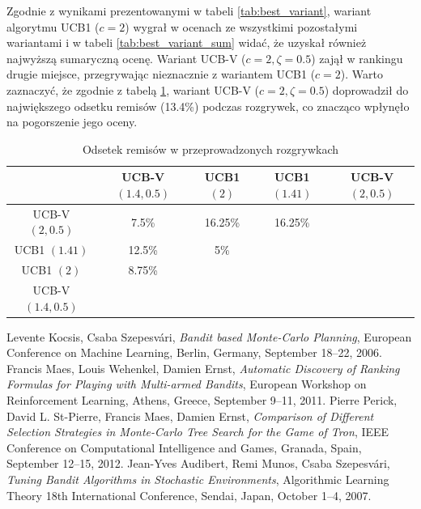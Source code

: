 \documentclass[a4paper,12pt]{article}
\begin{document}
Zgodnie z wynikami prezentowanymi w tabeli \ref{tab:best_variant}, wariant algorytmu UCB1 ($c=2$) wygrał w ocenach ze wszystkimi pozostałymi wariantami i w tabeli \ref{tab:best_variant_sum} widać, że uzyskał również najwyższą sumaryczną ocenę. Wariant UCB-V ($c=2, \zeta=0.5$) zajął w rankingu drugie miejsce, przegrywając nieznacznie z wariantem UCB1 ($c=2$). Warto zaznaczyć, że zgodnie z tabelą \ref{tab:draw_count}, wariant UCB-V ($c=2, \zeta=0.5$) doprowadził do największego odsetku remisów (13.4\%) podczas rozgrywek, co znacząco wpłynęło na pogorszenie jego oceny.

\begin{table}[!h]
	\centering
	\begin{tabular}{|c|c|c|c|c|} \hline
		& UCB-V $(1.4, 0.5)$ & UCB1 $(2)$ & UCB1 $(1.41)$ & UCB-V $(2, 0.5)$ \\ \hline
		UCB-V $(2, 0.5)$ & 7.5\% & 16.25\% & 16.25\% & \cellcolor{lightgray} \\ \hline
		UCB1 $(1.41)$ & 12.5\% & 5\% & \cellcolor{lightgray} & \cellcolor{lightgray} \\ \hline
		UCB1 $(2)$ & 8.75\% & \cellcolor{lightgray} & \cellcolor{lightgray} & \cellcolor{lightgray}  \\ \hline
		UCB-V $(1.4, 0.5)$ & \cellcolor{lightgray} & \cellcolor{lightgray} & \cellcolor{lightgray} & \cellcolor{lightgray} \\ \hline
	\end{tabular}
	\caption{Odsetek remisów w przeprowadzonych rozgrywkach}
	\label{tab:draw_count}
\end{table}

\begin{thebibliography}{20}
	 Levente Kocsis, Csaba Szepesvári, \emph{Bandit based Monte-Carlo Planning}, European Conference on Machine Learning, Berlin, Germany, September 18--22, 2006.
	 Francis Maes, Louis Wehenkel, Damien Ernst, \emph{Automatic Discovery of Ranking Formulas for Playing with Multi-armed Bandits}, European Workshop on Reinforcement Learning, Athens, Greece, September 9--11, 2011.
	 Pierre Perick, David L. St-Pierre, Francis Maes, Damien Ernst, \emph{Comparison of Different Selection Strategies in Monte-Carlo Tree Search for the Game of Tron},  IEEE Conference on Computational Intelligence and Games, Granada, Spain, September 12--15, 2012. %
	 Jean-Yves Audibert, Remi Munos, Csaba Szepesvári, \emph{Tuning Bandit Algorithms in Stochastic Environments}, Algorithmic Learning Theory 18th International Conference, Sendai, Japan, October 1--4, 2007. %
\end{thebibliography}
\end{document}
